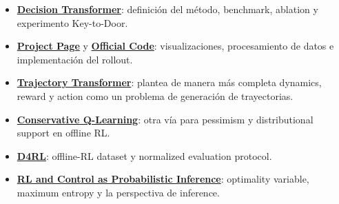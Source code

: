 {\small
\begin{itemize}[nosep,leftmargin=*]
  \item \href{https://arxiv.org/abs/2106.01345}{\textbf{Decision Transformer}}: definición del método, benchmark, ablation y experimento Key-to-Door.
  \item \href{https://sites.google.com/berkeley.edu/decision-transformer}{\textbf{Project Page}} y \href{https://github.com/kzl/decision-transformer}{\textbf{Official Code}}: visualizaciones, procesamiento de datos e implementación del rollout.
  \item \href{https://arxiv.org/abs/2106.02039}{\textbf{Trajectory Transformer}}: plantea de manera más completa dynamics, reward y action como un problema de generación de trayectorias.
  \item \href{https://arxiv.org/abs/2006.04779}{\textbf{Conservative Q-Learning}}: otra vía para pessimism y distributional support en offline RL.
  \item \href{https://arxiv.org/abs/2004.07219}{\textbf{D4RL}}: offline-RL dataset y normalized evaluation protocol.
  \item \href{https://arxiv.org/abs/1805.00909}{\textbf{RL and Control as Probabilistic Inference}}: optimality variable, maximum entropy y la perspectiva de inference.
\end{itemize}
}


